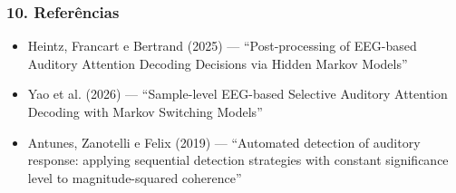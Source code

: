 \documentclass{beamer}
\begin{document}
\frame
{\frametitle{\LARGE 10. Referências}
\large

\begin{itemize}
    \item Heintz, Francart e Bertrand (2025) — “Post-processing of EEG-based Auditory Attention Decoding Decisions via Hidden Markov Models”
    \item Yao et al. (2026) — “Sample-level EEG-based Selective Auditory Attention Decoding with Markov Switching Models”
    \item Antunes, Zanotelli e Felix (2019) — “Automated detection of auditory response: applying sequential detection strategies with constant significance level to magnitude-squared coherence”
\end{itemize}
}
\end{document}
